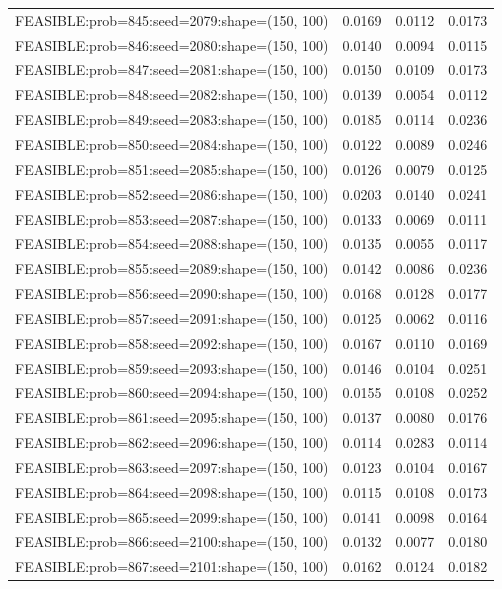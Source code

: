 \begin{longtable}{lccc}
FEASIBLE:prob=845:seed=2079:shape=(150, 100) &   0.0169 & 0.0112 & 0.0173 \\
FEASIBLE:prob=846:seed=2080:shape=(150, 100) &   0.0140 & 0.0094 & 0.0115 \\
FEASIBLE:prob=847:seed=2081:shape=(150, 100) &   0.0150 & 0.0109 & 0.0173 \\
FEASIBLE:prob=848:seed=2082:shape=(150, 100) &   0.0139 & 0.0054 & 0.0112 \\
FEASIBLE:prob=849:seed=2083:shape=(150, 100) &   0.0185 & 0.0114 & 0.0236 \\
FEASIBLE:prob=850:seed=2084:shape=(150, 100) &   0.0122 & 0.0089 & 0.0246 \\
FEASIBLE:prob=851:seed=2085:shape=(150, 100) &   0.0126 & 0.0079 & 0.0125 \\
FEASIBLE:prob=852:seed=2086:shape=(150, 100) &   0.0203 & 0.0140 & 0.0241 \\
FEASIBLE:prob=853:seed=2087:shape=(150, 100) &   0.0133 & 0.0069 & 0.0111 \\
FEASIBLE:prob=854:seed=2088:shape=(150, 100) &   0.0135 & 0.0055 & 0.0117 \\
FEASIBLE:prob=855:seed=2089:shape=(150, 100) &   0.0142 & 0.0086 & 0.0236 \\
FEASIBLE:prob=856:seed=2090:shape=(150, 100) &   0.0168 & 0.0128 & 0.0177 \\
FEASIBLE:prob=857:seed=2091:shape=(150, 100) &   0.0125 & 0.0062 & 0.0116 \\
FEASIBLE:prob=858:seed=2092:shape=(150, 100) &   0.0167 & 0.0110 & 0.0169 \\
FEASIBLE:prob=859:seed=2093:shape=(150, 100) &   0.0146 & 0.0104 & 0.0251 \\
FEASIBLE:prob=860:seed=2094:shape=(150, 100) &   0.0155 & 0.0108 & 0.0252 \\
FEASIBLE:prob=861:seed=2095:shape=(150, 100) &   0.0137 & 0.0080 & 0.0176 \\
FEASIBLE:prob=862:seed=2096:shape=(150, 100) &   0.0114 & 0.0283 & 0.0114 \\
FEASIBLE:prob=863:seed=2097:shape=(150, 100) &   0.0123 & 0.0104 & 0.0167 \\
FEASIBLE:prob=864:seed=2098:shape=(150, 100) &   0.0115 & 0.0108 & 0.0173 \\
FEASIBLE:prob=865:seed=2099:shape=(150, 100) &   0.0141 & 0.0098 & 0.0164 \\
FEASIBLE:prob=866:seed=2100:shape=(150, 100) &   0.0132 & 0.0077 & 0.0180 \\
FEASIBLE:prob=867:seed=2101:shape=(150, 100) &   0.0162 & 0.0124 & 0.0182 \\

\end{longtable}
